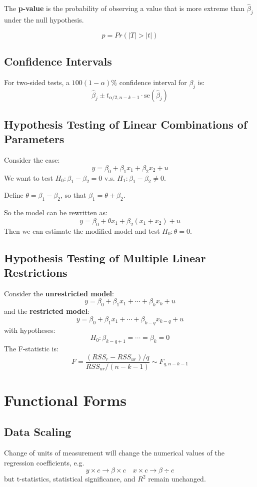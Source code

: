 \documentclass[11pt,a4paper]{article}
\begin{document}
The \textbf{p-value} is the probability of observing a value that is more extreme than $\hat{\beta}_j$ under the null hypothesis. \par
\[
p = Pr(|T| > |t|)
\]
 \par
{}

\subsection{Confidence Intervals}
For two-sided tests, a $100(1-\alpha)\%$ confidence interval for $\beta_j$ is:
\[
\hat{\beta}_j \pm t_{\alpha/2, n-k-1} \cdot \text{se}(\hat{\beta}_j)
\]

\subsection{Hypothesis Testing of Linear Combinations of Parameters}
Consider the case:
\[
y = \beta_0 + \beta_1 x_1 + \beta_2 x_2 + u
\]
We want to test $H_0: \beta_1 - \beta_2 = 0$ v.s. $H_1: \beta_1 - \beta_2 \neq 0$. \par
Define $\theta = \beta_1 - \beta_2$, so that $\beta_1 = \theta + \beta_2$. \par
So the model can be rewritten as:
\[
y = \beta_0 + \theta x_1 + \beta_2 (x_1 + x_2) + u
\]
Then we can estimate the modified model and test $H_0: \theta = 0$.

\subsection{Hypothesis Testing of Multiple Linear Restrictions}
Consider the \textbf{unrestricted model}:
\[
y = \beta_0 + \beta_1 x_1 + \cdots + \beta_k x_k + u
\]
and the \textbf{restricted model}:
\[
y = \beta_0 + \beta_1 x_1 + \cdots + \beta_{k-q} x_{k-q} + u
\]
with hypotheses:
\[
H_0: \beta_{k-q+1} = \cdots = \beta_k = 0 
\]
The F-statistic is:
\[
F = \frac{(RSS_r - RSS_{ur}) / q}{RSS_{ur} / (n-k-1)} \sim F_{q, n-k-1}
\]

\section{Functional Forms}
\subsection{Data Scaling}
Change of units of measurement will change the numerical values of the regression coefficients, e.g.
\[
y \times c \rightarrow \beta \times c \quad
x \times c \rightarrow \beta \div c
\]
but t-statistics, statistical significance, and $R^2$ remain unchanged. \par
\end{document}
